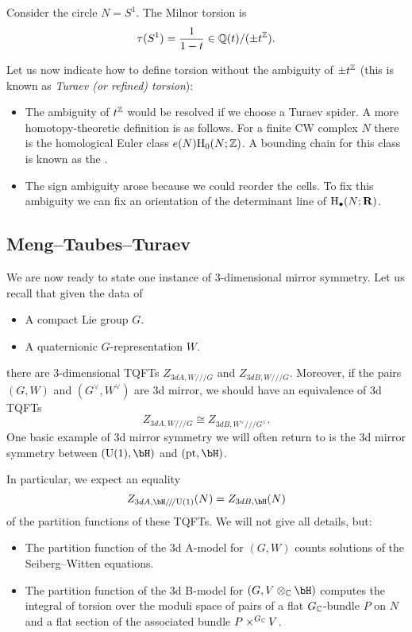 \begin{example}
	Consider the circle $N=S^1$. The Milnor torsion is
	\[\tau(S^1) = \frac{1}{1-t}\in\mathbb{Q}(t)/(\pm t^{\mathbb{Z}}).\]
\end{example}

Let us now indicate how to define torsion without the ambiguity of $\pm t^{\mathbb{Z}}$ (this is known as \emph{Turaev (or refined) torsion}):
\begin{itemize}
	\item The ambiguity of $t^{\mathbb{Z}}$ would be resolved if we choose a Turaev spider. A more homotopy-theoretic definition is as follows. For a finite CW complex $N$ there is the homological Euler class $e(N)\mathrm{H}_0(N; \mathbb{Z})$. A bounding chain for this class is known as the .
	
	\item The sign ambiguity arose because we could reorder the cells. To fix this ambiguity we can fix an orientation of the determinant line of $\mathrm{H}_\bullet(N;\mathbf{R})$.
\end{itemize}

\subsection{Meng--Taubes--Turaev}

We are now ready to state one instance of 3-dimensional mirror symmetry. Let us recall that given the data of
\begin{itemize}
	\item A compact Lie group $G$.
	\item A quaternionic $G$-representation $W$.
\end{itemize}
there are 3-dimensional TQFTs $Z_{3dA, W/\!/\!/G}$ and $Z_{3dB, W/\!/\!/G}$. Moreover, if the pairs $(G, W)$ and $(G^\vee, W^\vee)$ are 3d mirror, we should have an equivalence of 3d TQFTs
\[Z_{3dA, W/\!/\!/G}\cong Z_{3dB, W^\vee/\!/\!/G^\vee}.\]
One basic example of 3d mirror symmetry we will often return to is the 3d mirror symmetry between $(\U(1), \bH)$ and $(\pt, \bH)$.

In particular, we expect an equality
\[Z_{3dA, \bH/\!/\!/\U(1)}(N) = Z_{3dB, \bH}(N)\]
of the partition functions of these TQFTs. We will not give all details, but:
\begin{itemize}
	\item The partition function of the 3d A-model for $(G, W)$ counts solutions of the Seiberg--Witten equations.
	\item The partition function of the 3d B-model for $(G, V\otimes_\C \bH)$ computes the integral of torsion over the moduli space of pairs of a flat $G_{\mathbb{C}}$-bundle $P$ on $N$ and a flat section of the associated bundle $P\times^{G_{\mathbb{C}}} V$.
\end{itemize}

